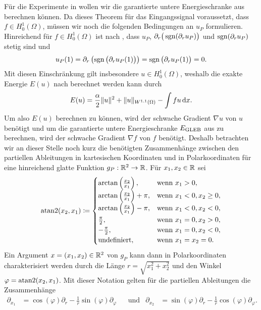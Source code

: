 Für die Experimente in  wollen wir die
garantierte untere Energieschranke aus  berechnen können. 
Da dieses Theorem für das Eingangssignal voraussetzt, dass $f\in
H^1_0(\Omega)$, müssen wir noch die folgenden Bedingungen an $u_P$ formulieren.
Hinreichend für $f\in H^1_0(\Omega)$ ist nach ,
dass  $u_P$, $\partial_r\big(\operatorname{sgn}(\partial_r u_P)\big)$ und $\operatorname{sgn}(\partial_r
u_P)$ stetig sind und 
\begin{align*}
  u_P(1)
  =
  \partial_r\left( \operatorname{sgn}\big(\partial_r u_P(1)\big)\right)
  =
  \operatorname{sgn}\big(\partial_r u_P(1)\big)
  =
  0.
\end{align*}
Mit diesen Einschränkung gilt insbesondere $u\in H^1_0(\Omega)$, weshalb 
die exakte Energie $E(u)$ nach  berechnet werden kann
durch 
\begin{align*}
  E(u)
  =
  \frac{\alpha}{2}\Vert u\Vert^2 + \Vert u\Vert_{W^{1,1}(\Omega)} 
  - \int fu\,\mathrm{d}x.
\end{align*}
Um also $E(u)$ berechnen zu können, wird der schwache Gradient $\nabla u$ von
$u$ benötigt und um die garantierte untere Energieschranke $E_\textup{GLEB}$ aus
 zu berechnen, wird der schwache Gradient $\nabla f$ von $f$
benötigt.
Deshalb betrachten wir an dieser Stelle noch kurz die benötigten Zusammenhänge
zwischen den partiellen Ableitungen in kartesischen Koordinaten und in
Polarkoordinaten für eine hinreichend glatte Funktion $g_P:\mathbb{R}^2\to\mathbb{R}$.
Für $x_1,x_2\in\mathbb{R}$ sei
\begin{align*}
  \operatorname{atan2}(x_2,x_1)\coloneqq
  \begin{cases}
    \arctan\left( \frac{x_2}{x_1} \right),& \text{wenn }x_1>0,\\
    \arctan\left( \frac{x_2}{x_1} \right) +\pi,& \text{wenn }x_1<0,x_2\geq 0,\\
    \arctan\left( \frac{x_2}{x_1} \right) -\pi,& \text{wenn }x_1<0,x_2<0,\\
    \frac{\pi}{2},& \text{wenn }x_1=0,x_2>0,\\
    -\frac{\pi}{2},& \text{wenn }x_1=0,x_2<0,\\
    \text{undefiniert},& \text{wenn }x_1=x_2=0.
  \end{cases}
\end{align*}
Ein Argument $x=(x_1,x_2)\in\mathbb{R}^2$ von $g_P$ kann dann in Polarkoordinaten 
charakterisiert werden durch die Länge $r=\sqrt{x_1^2+x_2^2}$ und den Winkel
$\varphi = \operatorname{atan2}(x_2,x_1)$.
Mit dieser Notation gelten für die partiellen Ableitungen die Zusammenhänge
\begin{align*}
  \partial_{x_1} &= 
  \cos(\varphi)\partial_r - \frac{1}{r}\sin(\varphi)\partial_\varphi
  &&\text{und}
  &\partial_{x_2} &= 
  \sin(\varphi)\partial_r - \frac{1}{r}\cos(\varphi)\partial_\varphi.
\end{align*}
